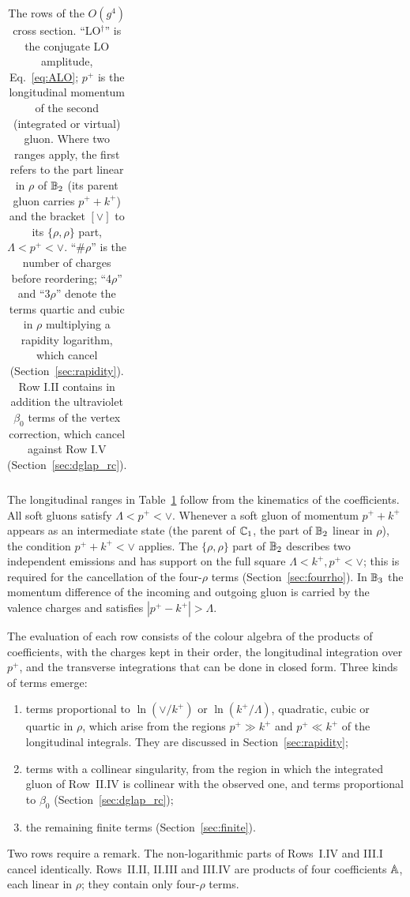 \begin{table}[t]
\begin{tabular}{@{}l p{4.0cm} p{2.9cm} l p{3.4cm}@{}}
\bottomrule
\end{tabular}
\caption{The rows of the $O(g^4)$ cross section. ``LO$^\dagger$'' is the conjugate LO amplitude, Eq.~\eqref{eq:ALO}; $p^+$ is the longitudinal momentum of the second (integrated or virtual) gluon. Where two ranges apply, the first refers to the part linear in $\rho$ of $\mathbb{B}_2$ (its parent gluon carries $p^++k^+$) and the bracket $[\vee]$ to its $\{\rho,\rho\}$ part, $\Lambda<p^+<\vee$. ``$\#\rho$'' is the number of charges before reordering; ``4$\rho$'' and ``3$\rho$'' denote the terms quartic and cubic in $\rho$ multiplying a rapidity logarithm, which cancel (Section~\ref{sec:rapidity}). Row I.II contains in addition the ultraviolet $\beta_0$ terms of the vertex correction, which cancel against Row I.V (Section~\ref{sec:dglap_rc}).}
\label{tab:rows}
\end{table}

The longitudinal ranges in Table~\ref{tab:rows} follow from the kinematics of the coefficients. All soft gluons satisfy $\Lambda<p^+<\vee$. Whenever a soft gluon of momentum $p^++k^+$ appears as an intermediate state (the parent of $\mathbb{C}_1$, the part of $\mathbb{B}_2$ linear in $\rho$), the condition $p^++k^+<\vee$ applies. The $\{\rho,\rho\}$ part of $\mathbb{B}_2$ describes two independent emissions and has support on the full square $\Lambda<k^+,p^+<\vee$; this is required for the cancellation of the four-$\rho$ terms (Section~\ref{sec:fourrho}). In $\mathbb{B}_3$ the momentum difference of the incoming and outgoing gluon is carried by the valence charges and satisfies $|p^+-k^+|>\Lambda$.

The evaluation of each row consists of the colour algebra of the products of coefficients, with the charges kept in their order, the longitudinal integration over $p^+$, and the transverse integrations that can be done in closed form. Three kinds of terms emerge:
\begin{enumerate}
\item terms proportional to $\ln(\vee/k^+)$ or $\ln(k^+/\Lambda)$, quadratic, cubic or quartic in $\rho$, which arise from the regions $p^+\gg k^+$ and $p^+\ll k^+$ of the longitudinal integrals. They are discussed in Section~\ref{sec:rapidity};
\item terms with a collinear singularity, from the region in which the integrated gluon of Row~II.IV is collinear with the observed one, and terms proportional to $\beta_0$ (Section~\ref{sec:dglap_rc});
\item the remaining finite terms (Section~\ref{sec:finite}).
\end{enumerate}
Two rows require a remark. The non-logarithmic parts of Rows~I.IV and III.I cancel identically. Rows~II.II, II.III and III.IV are products of four coefficients $\mathbb{A}$, each linear in $\rho$; they contain only four-$\rho$ terms.
